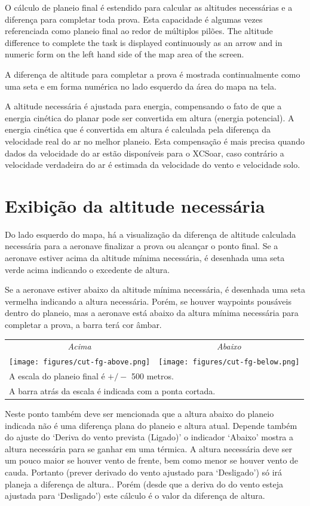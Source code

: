 O cálculo de planeio final é estendido para calcular as altitudes necessárias e a diferença para completar toda prova.  Esta capacidade é algumas vezes referenciada como planeio final ao redor de múltiplos pilões.  
The altitude difference to complete the task is displayed continuously
as an arrow and in numeric form on the left hand side of the map area
of the screen.

A diferença de altitude para completar a prova é mostrada continualmente como uma seta e em forma numérica no lado esquerdo da área do mapa na tela.

A altitude necessária é ajustada para energia, compensando o fato de que a energia cinética do planar pode ser convertida em altura (energia potencial).  A energia cinética que é convertida em altura é calculada pela diferença da velocidade real do ar no melhor planeio.  Esta compensação é mais precisa quando dados da velocidade do ar estão disponíveis para o XCSoar, caso contrário a velocidade verdadeira do ar é estimada da velocidade do vento e velocidade solo.


\section{Exibição da altitude necessária}

Do lado esquerdo do mapa, há a visualização da diferença de altitude calculada necessária para a aeronave finalizar a prova ou alcançar o ponto final.  Se a aeronave estiver acima da altitude mínima necessária, é desenhada uma seta verde acima indicando o excedente de altura.

Se a aeronave estiver abaixo da altitude mínima necessária, é desenhada uma seta vermelha indicando a altura necessária.  Porém, se houver waypoints pousáveis dentro do planeio, mas a aeronave está abaixo da altura mínima necessária para completar a prova, a barra terá cor âmbar.

\begin{center}
\begin{tabular}{c c}
{\it Acima} & {\it Abaixo} \\
\texttt{[image: figures/cut-fg-above.png]} &
\texttt{[image: figures/cut-fg-below.png]} \\
\multicolumn{2}{l}{A escala do planeio final é $+/-$ 500 metros.} \\
\multicolumn{2}{l}{A barra atrás da escala é indicada com a ponta cortada.}
\end{tabular}
\end{center}
\tip
Neste ponto também deve ser mencionada que a altura abaixo do planeio indicada não é uma diferença plana do planeio e altura atual.  Depende também do ajuste do ‘Deriva do vento prevista (Ligado)’ o indicador ‘Abaixo’ mostra a altura necessária para se ganhar em uma térmica.  
A altura necessária deve ser um pouco maior se houver vento de frente, bem como menor se houver vento de cauda.  Portanto (prever derivado do vento ajustado para ‘Desligado’) só irá planeja a diferença de altura..  Porém (desde que a deriva do do vento esteja ajustada para ‘Desligado’) este cálculo é o valor da diferença de altura.
 


